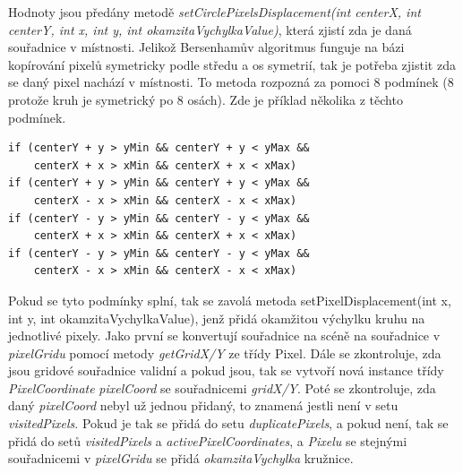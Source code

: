 Hodnoty jsou předány metodě \textit{setCirclePixelsDisplacement(int centerX, int centerY, int x, int y, int okamzitaVychylkaValue)}, která zjistí zda je daná souřadnice v místnosti. Jelikož Bersenhamův algoritmus funguje na bázi kopírování pixelů symetricky podle středu a os symetrií, tak je potřeba zjistit zda se daný pixel nachází v místnosti. To metoda rozpozná za pomoci 8 podmínek (8 protože kruh je symetrický po 8 osách). Zde je příklad několika z těchto podmínek. 
\begin{verbatim}
if (centerY + y > yMin && centerY + y < yMax &&
    centerX + x > xMin && centerX + x < xMax)
if (centerY + y > yMin && centerY + y < yMax &&
    centerX - x > xMin && centerX - x < xMax)
if (centerY - y > yMin && centerY - y < yMax &&
    centerX + x > xMin && centerX + x < xMax)
if (centerY - y > yMin && centerY - y < yMax &&
    centerX - x > xMin && centerX - x < xMax)
\end{verbatim}
Pokud se tyto podmínky splní, tak se zavolá metoda setPixelDisplacement(int x, int y, int okamzitaVychylkaValue), jenž přidá okamžitou výchylku kruhu na jednotlivé pixely. Jako první se konvertují souřadnice na scéně na souřadnice v \textit{pixelGridu} pomocí metody \textit{getGridX/Y} ze třídy Pixel. Dále se zkontroluje, zda jsou gridové souřadnice validní a pokud jsou, tak se vytvoří nová instance třídy \textit{PixelCoordinate} \textit{ pixelCoord} se souřadnicemi \textit{gridX/Y}. Poté se zkontroluje, zda daný \textit{pixelCoord} nebyl už jednou přidaný, to znamená jestli není v setu \textit{visitedPixels}. Pokud je tak se přidá do setu \textit{duplicatePixels}, a pokud není, tak se přidá do setů \textit{visitedPixels} a \textit{activePixelCoordinates}, a  \textit{Pixelu} se stejnými souřadnicemi v \textit{pixelGridu} se přidá \textit{okamzitaVychylka} kružnice.  


